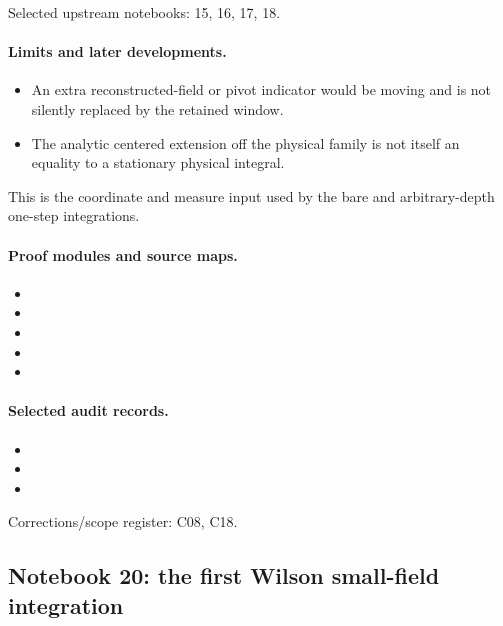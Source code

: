 Selected upstream notebooks: 15, 16, 17, 18.\par

\paragraph{Limits and later developments.}
\begin{itemize}
\item An extra reconstructed-field or pivot indicator would be moving and is not silently replaced by the retained window.
\item The analytic centered extension off the physical family is not itself an equality to a stationary physical integral.
\end{itemize}

This is the coordinate and measure input used by the bare and arbitrary-depth one-step integrations.

\paragraph{Proof modules and source maps.}
\begingroup\small
\begin{itemize}
\item {}
\item {}
\item {}
\item {}
\item {}
\end{itemize}
\endgroup

\paragraph{Selected audit records.}
\begingroup\small
\begin{itemize}
\item {}
\item {}
\item {}
\end{itemize}
\endgroup
Corrections/scope register: C08, C18.\par

\subsection{Notebook 20: the first Wilson small-field integration}
\label{hnc-20}
\noindent{}\par

